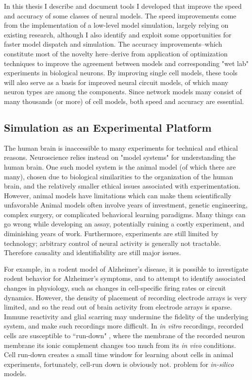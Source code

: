 In this thesis I describe and document tools I developed that improve the speed and accuracy of some classes of neural models.
The speed improvements come from the implementation of a low-level model simulation, largely relying on existing research, although I also identify and exploit some opportunities for faster model dispatch and simulation.
The accuracy improvements--which constitute most of the novelty here--derive from application of optimization techniques to improve the agreement between models and corresponding "wet lab" experiments in biological neurons.
By improving single cell models, these tools will also serve as a basis for improved neural circuit models, of which many neuron types are among the components.
Since network models many consist of many thousands (or more) of cell models, both speed and accuracy are essential.
\\

\subsection{Simulation as an Experimental Platform}
The human brain is inaccessible to many experiments for technical and ethical reasons.
Neuroscience relies instead on "model systems" for understanding the human brain.
One such model system is the animal model (of which there are many), chosen due to biological similarities to the organization of the human brain, and the relatively smaller ethical issues associated with experimentation.
However, animal models have limitations which can make them scientifically unfavorable
Animal models often involve years of investment, genetic engineering, complex surgery, or complicated behavioral learning paradigms.
Many things can go wrong while developing an assay, potentially ruining a costly experiment, and diminishing years of work.
Furthermore, experiments are still limited by technology; arbitrary control of neural activity is generally not tractable.
Therefore causality and identifiability are still major issues.

For example, in a rodent model of Alzheimer's disease, it is possible to investigate rodent behavior for Alzheimer's symptoms, and to attempt to identify associated changes in physiology, such as changes in cell-specific firing rates or circuit dynamics.
However, the density of placement of recording electrode arrays is very limited, and so the read out of brain activity from electrode arrays is sparse.
Immune reactivity and glial scarring may undermine the fidelity of the underlying system, and make such recordings more difficult.
In \emph{in vitro} recordings, recorded cells are susceptible to ``run-down" \citep{colquhoun1994ion}, where the membrane of the recorded neuron membrane its ionic complement changes too much from its \emph{in vivo} conditions. 
Cell run-down creates a small time window for learning about cells in animal experiments, fortunately, cell-run down is obviously not. problem for \emph{in-silico} models.

